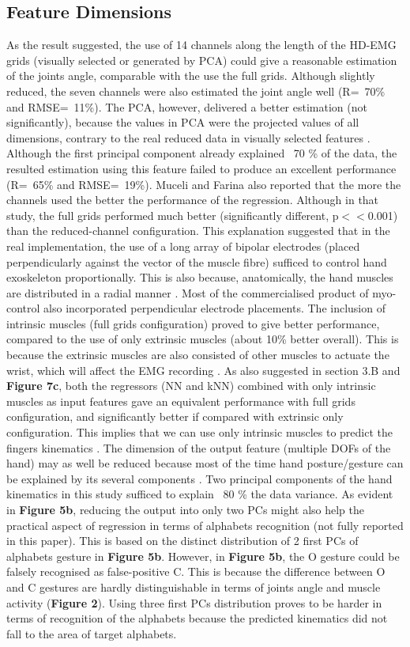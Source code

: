 \documentclass[conference]{IEEEtran}
\begin{document}
\subsection{Feature Dimensions}
As the result suggested, the use of 14 channels along the length of the HD-EMG grids (visually selected 
or generated by PCA) could give a reasonable estimation of the joints angle, comparable with the use the 
full grids. Although slightly reduced, the seven channels were also estimated the joint angle well (R=~70\% 
and RMSE=~11\%). The PCA, however, delivered a better estimation (not significantly), because the values 
in PCA were the projected values of all dimensions, contrary to the real reduced data in visually selected 
features \cite{b37}. Although the first principal component already explained ~70 \% of the data, the resulted 
estimation using this feature failed to produce an excellent performance (R=~65\% and RMSE=~19\%). 
Muceli and Farina \cite{b9} also reported that the more the channels used the better the performance of the 
regression. Although in that study, the full grids performed much better (significantly different, p$<<$0.001) 
than the reduced-channel configuration.
This explanation suggested that in the real implementation, the use of a long array of bipolar electrodes 
(placed perpendicularly against the vector of the muscle fibre) sufficed to control hand exoskeleton 
proportionally. This is also because, anatomically, the hand muscles are distributed in a radial manner \cite{b38}. 
Most of the commercialised product of myo-control also incorporated perpendicular electrode placements.
The inclusion of intrinsic muscles (full grids configuration) proved to give better performance, 
compared to the use of only extrinsic muscles (about 10\% better overall). This is because the extrinsic 
muscles are also consisted of other muscles to actuate the wrist, which will affect the EMG recording \cite{b39}.
As also suggested in section 3.B and \textbf{Figure 7c}, both the regressors (NN and kNN) combined with only 
intrinsic muscles as input features gave an equivalent performance with full grids configuration, and 
significantly better if compared with extrinsic only configuration. This implies that we can use only intrinsic 
muscles to predict the fingers kinematics \cite{b22}.
The dimension of the output feature (multiple DOFs of the hand) may as well be reduced because most 
of the time hand posture/gesture can be explained by its several components \cite{b32}\cite{b28}. Two principal 
components of the hand kinematics in this study sufficed to explain ~80 \% the data variance. As evident in 
\textbf{Figure 5b}, reducing the output into only two PCs might also help the practical aspect of regression in terms 
of alphabets recognition (not fully reported in this paper). This is based on the distinct distribution of 2 first 
PCs of alphabets gesture in \textbf{Figure 5b}. However, in \textbf{Figure 5b}, the O gesture could be falsely recognised as 
false-positive C. This is because the difference between O and C gestures are hardly distinguishable in terms 
of joints angle and muscle activity (\textbf{Figure 2}). Using three first PCs distribution proves to be 
harder in terms of recognition of the alphabets because the predicted kinematics did not fall to the area of 
target alphabets.
\end{document}
